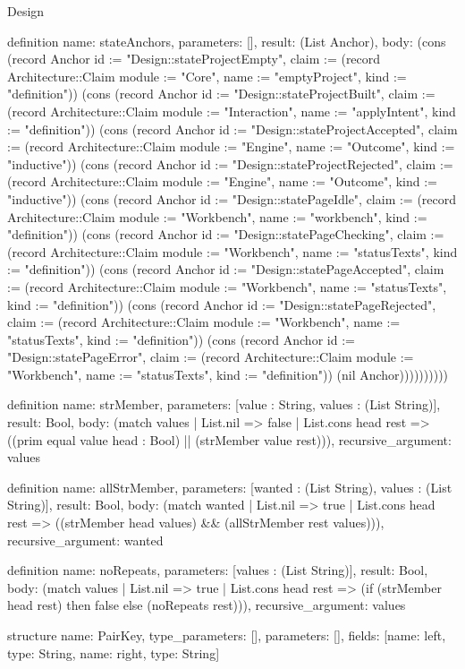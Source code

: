 \begin{lexlean}{Design}
\begin{semanticmodule}
definition{
  name: stateAnchors,
  parameters: [],
  result: (List Anchor),
  body: (cons (record Anchor {id := "Design::stateProjectEmpty", claim := (record Architecture::Claim {module := "Core", name := "emptyProject", kind := "definition"})}) (cons (record Anchor {id := "Design::stateProjectBuilt", claim := (record Architecture::Claim {module := "Interaction", name := "applyIntent", kind := "definition"})}) (cons (record Anchor {id := "Design::stateProjectAccepted", claim := (record Architecture::Claim {module := "Engine", name := "Outcome", kind := "inductive"})}) (cons (record Anchor {id := "Design::stateProjectRejected", claim := (record Architecture::Claim {module := "Engine", name := "Outcome", kind := "inductive"})}) (cons (record Anchor {id := "Design::statePageIdle", claim := (record Architecture::Claim {module := "Workbench", name := "workbench", kind := "definition"})}) (cons (record Anchor {id := "Design::statePageChecking", claim := (record Architecture::Claim {module := "Workbench", name := "statusTexts", kind := "definition"})}) (cons (record Anchor {id := "Design::statePageAccepted", claim := (record Architecture::Claim {module := "Workbench", name := "statusTexts", kind := "definition"})}) (cons (record Anchor {id := "Design::statePageRejected", claim := (record Architecture::Claim {module := "Workbench", name := "statusTexts", kind := "definition"})}) (cons (record Anchor {id := "Design::statePageError", claim := (record Architecture::Claim {module := "Workbench", name := "statusTexts", kind := "definition"})}) (nil Anchor))))))))))
}

definition{
  name: strMember,
  parameters: [value : String, values : (List String)],
  result: Bool,
  body: (match values
    | List.nil => false
    | List.cons head rest => ((prim equal value head : Bool) || (strMember value rest))),
  recursive_argument: values
}

definition{
  name: allStrMember,
  parameters: [wanted : (List String), values : (List String)],
  result: Bool,
  body: (match wanted
    | List.nil => true
    | List.cons head rest => ((strMember head values) && (allStrMember rest values))),
  recursive_argument: wanted
}

definition{
  name: noRepeats,
  parameters: [values : (List String)],
  result: Bool,
  body: (match values
    | List.nil => true
    | List.cons head rest => (if (strMember head rest) then false else (noRepeats rest))),
  recursive_argument: values
}

structure{
  name: PairKey,
  type_parameters: [],
  parameters: [],
  fields: [{name: left, type: String}, {name: right, type: String}]
}


\end{semanticmodule}
\end{lexlean}
